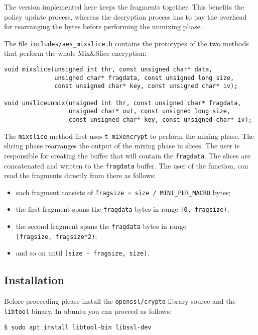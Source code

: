 The version implemented here keeps the fragments together. This benefits
the policy update process, whereas the decryption process has to pay the
overhead for rearranging the bytes before performing the unmixing phase.

The file \texttt{includes/aes\_mixslice.h} contains the prototypes of
the two methods that perform the whole Mix\&Slice encryption:

\begin{verbatim}
void mixslice(unsigned int thr, const unsigned char* data,
              unsigned char* fragdata, const unsigned long size,
              const unsigned char* key, const unsigned char* iv);

void unsliceunmix(unsigned int thr, const unsigned char* fragdata,
                  unsigned char* out, const unsigned long size,
                  const unsigned char* key, const unsigned char* iv);
\end{verbatim}

The \texttt{mixslice} method first uses \texttt{t\_mixencrypt} to
perform the mixing phase. The slicing phase rearranges the output of the
mixing phase in slices. The user is responsible for creating the buffer
that will contain the \texttt{fragdata}. The slices are concatenated and
written to the \texttt{fragdata} buffer. The user of the function, can
read the fragments directly from there as follows:

\begin{itemize}
\tightlist
\item
  each fragment consists of
  \texttt{fragsize\ =\ size\ /\ MINI\_PER\_MACRO} bytes;
\item
  the first fragment spans the \texttt{fragdata} bytes in range
  \texttt{{[}0,\ fragsize)};
\item
  the second fragment spans the \texttt{fragdata} bytes in range
  \texttt{{[}fragsize,\ fragsize*2)};
\item
  and so on until \texttt{{[}size\ -\ fragsize,\ size)}.
\end{itemize}


\subsection{Installation}

Before proceeding please install the \texttt{openssl/crypto} library
source and the \texttt{libtool} binary. In ubuntu you can proceed as
follows:

\begin{verbatim}
$ sudo apt install libtool-bin libssl-dev
\end{verbatim}

